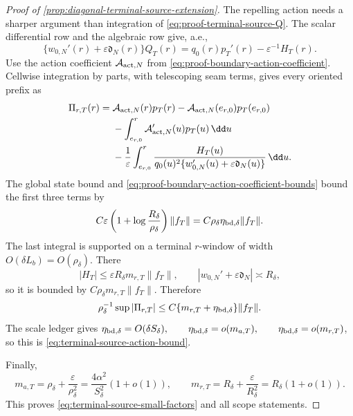 \begin{proof}[Proof of
\cref{prop:diagonal-terminal-source-extension}]
The repelling action needs a sharper argument than integration of
\cref{eq:proof-terminal-source-Q}.  The scalar differential row and the
algebraic row give, a.e.,
\begin{equation}
 \{w_{0,N}'(r)+\varepsilon\mathfrak d_N(r)\}Q_T(r)
 =q_0(r)p_T'(r)-\varepsilon^{-1}H_T(r).           \label{eq:proof-terminal-source-Q-recovery}
\end{equation}
Use the action coefficient
\(
\mathcal A_{{\rm act},N}
\)
from \cref{eq:proof-boundary-action-coefficient}.  Cellwise integration
by parts, with telescoping seam terms, gives every oriented prefix as
\begin{align}
 \Pi_{r,T}(r)={}&
 \mathcal A_{{\rm act},N}(r)p_T(r)
 -\mathcal A_{{\rm act},N}(e_{r,0})p_T(e_{r,0})\notag\\
 &-\int_{e_{r,0}}^r
       \mathcal A_{{\rm act},N}'(u)p_T(u)\,\dd u\notag\\
 &-\frac1\varepsilon\int_{e_{r,0}}^r
   \frac{H_T(u)}{q_0(u)^2
       \{w_{0,N}'(u)+\varepsilon\mathfrak d_N(u)\}}\,\dd u.
                                                               \label{eq:proof-terminal-source-action-ibp}
\end{align}
The global state bound and
\cref{eq:proof-boundary-action-coefficient-bounds} bound the first three
terms by
\begin{equation*}
 C\varepsilon\left(1+\log\frac{R_\delta}{\rho_\delta}\right)
       \|f_T\|
 =C\rho_\delta\eta_{{\rm bd},\delta}\|f_T\|.
\end{equation*}
The last integral is supported on a terminal \(r\)-window of width
\(O(\delta L_b)=O(\rho_\delta)\).  There
\begin{equation*}
 |H_T|\le\varepsilon R_\delta m_{r,T}\|f_T\|,
 \qquad
 |w_{0,N}'+\varepsilon\mathfrak d_N|\asymp R_\delta,
\end{equation*}
so it is bounded by
\(
C\rho_\delta m_{r,T}\|f_T\|
\).
Therefore
\begin{equation}
 \rho_\delta^{-1}\sup|\Pi_{r,T}|
 \le C\{m_{r,T}+\eta_{{\rm bd},\delta}\}\|f_T\|.           \label{eq:proof-terminal-source-safe-action}
\end{equation}
The scale ledger gives
\(
\eta_{{\rm bd},\delta}=O(\delta S_\delta),\qquad
\eta_{{\rm bd},\delta}=o(m_{a,T}),\qquad
\eta_{{\rm bd},\delta}=o(m_{r,T})
\), so this is \cref{eq:terminal-source-action-bound}.

Finally,
\begin{equation*}
 m_{a,T}=\rho_\delta+\frac{\varepsilon}{\rho_\delta^2}
 =\frac{4\alpha^2}{S_\delta^2}(1+o(1)),
 \qquad
 m_{r,T}=R_\delta+\frac{\varepsilon}{R_\delta^2}
 =R_\delta(1+o(1)).
\end{equation*}
This proves \cref{eq:terminal-source-small-factors} and all scope
statements.
\end{proof}

